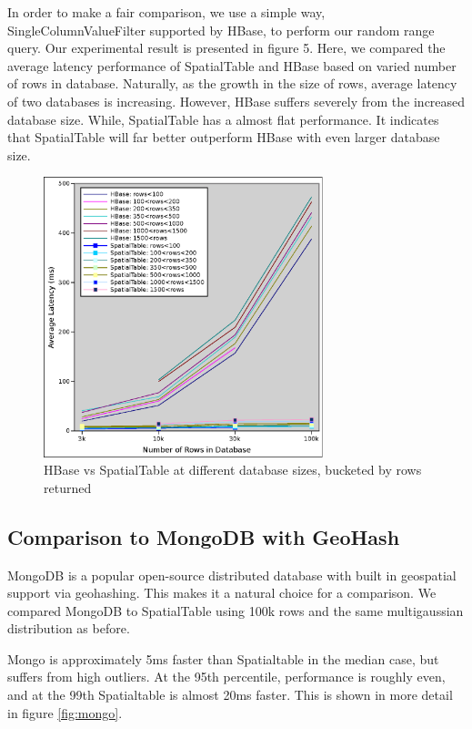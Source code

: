 \documentclass[11pt]{article}
\begin{document}
In order to make a fair comparison, we use a simple way, SingleColumnValueFilter supported by HBase, to perform our random range query. Our experimental result is presented in figure 5. Here, we compared the average latency performance of SpatialTable and HBase based on varied number of rows in database. Naturally, as the growth in the size of rows, average latency of two databases is increasing. However, HBase suffers severely from the increased database size. While, SpatialTable has a almost flat performance. It indicates that SpatialTable will far better outperform HBase with even larger database size.

\begin{figure}[h]
\centering
\includegraphics[width=3.2in]{st_hbase}
\caption{HBase vs SpatialTable at different database sizes, bucketed by rows returned}
\label{fig:hb}
\end{figure}



\subsection{Comparison to MongoDB with GeoHash}

MongoDB is a popular open-source distributed database with built in geospatial support via geohashing.\cite{mongospatial1,mongospatial2}  This makes it a natural choice for a comparison.  We compared MongoDB to SpatialTable using 100k rows and the same multigaussian distribution as before.


Mongo is approximately 5ms faster than Spatialtable in the median case, but suffers from high outliers.   At the 95th percentile, performance is roughly even, and at the 99th Spatialtable is almost 20ms faster.  This is shown in more detail in figure \ref{fig:mongo}.
\end{document}
